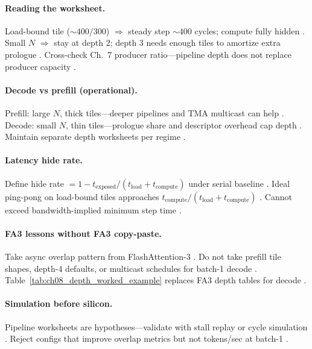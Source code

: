 \paragraph{Reading the worksheet.}
Load-bound tile (${\sim}400/300$) $\Rightarrow$ steady step ${\sim}400$ cycles; compute fully hidden \citep{shah2024flashattention3,semianalysis2024tma}.
Small $N$ $\Rightarrow$ stay at depth 2; depth 3 needs enough tiles to amortize extra prologue \citep{patel2025llminference,taxbreak2026}.
Cross-check Ch.~7 producer ratio---pipeline depth does not replace producer capacity \citep{yirage2026,dao2022flashattention}.

\paragraph{Decode vs prefill (operational).}
Prefill: large $N$, thick tiles---deeper pipelines and TMA multicast can help \citep{kwon2023vllm,shah2024flashattention3}.
Decode: small $N$, thin tiles---prologue share and descriptor overhead cap depth \citep{patel2025llminference,memoryfloor2026,taxbreak2026}.
Maintain separate depth worksheets per regime \citep{yirage2026,chen2020compilerbasedhardw}.

\paragraph{Latency hide rate.}
Define hide rate $= 1 - t_{\mathrm{exposed}} / (t_{\mathrm{load}} + t_{\mathrm{compute}})$ under serial baseline \citep{dlbook,semianalysis2024tma}.
Ideal ping-pong on load-bound tiles approaches $t_{\mathrm{compute}} / (t_{\mathrm{load}} + t_{\mathrm{compute}})$ \citep{shah2024flashattention3,patel2025llminference}.
Cannot exceed bandwidth-implied minimum step time \citep{memoryfloor2026,taxbreak2026}.

\paragraph{FA3 lessons without FA3 copy-paste.}
Take async overlap pattern from FlashAttention-3 \citep{shah2024flashattention3}.
Do not take prefill tile shapes, depth-4 defaults, or multicast schedules for batch-1 decode \citep{patel2025llminference,taxbreak2026,semianalysis2024tma}.
Table~\ref{tab:ch08_depth_worked_example} replaces FA3 depth tables for decode \citep{yirage2026,memoryfloor2026}.

\paragraph{Simulation before silicon.}
Pipeline worksheets are hypotheses---validate with stall replay or cycle simulation \citep{patel2025llminference,yirage2026,shah2024flashattention3}.
Reject configs that improve overlap metrics but not tokens/sec at batch-1 \citep{kwon2023vllm,taxbreak2026,chen2020compilerbasedhardw}.

